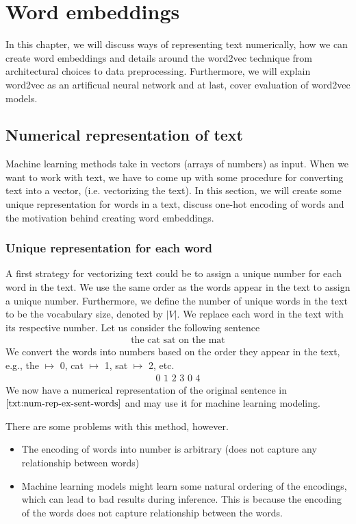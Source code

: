 \chapter{Word embeddings}
In this chapter, we will discuss ways of representing text numerically, how we can create word embeddings and details around the word2vec technique from architectural choices to data preprocessing. Furthermore, we will explain word2vec as an artificual neural network and at last, cover evaluation of word2vec models.

\section{Numerical representation of text}
Machine learning methods take in vectors (arrays of numbers) as input. When we want to work with text, we have to come up with some procedure for converting text into a vector, (i.e. vectorizing the text).
In this section, we will create some unique representation for words in a text, discuss one-hot encoding of words and the motivation behind creating word embeddings.

\subsection{Unique representation for each word}
\label{unique-representation-for-each-word}
A first strategy for vectorizing text could be to assign a unique number for each word in the text. We use the same order as the words appear in the text to assign a unique number. Furthermore, we define the number of unique words in the text to be the vocabulary size, denoted by $|V|$. We replace each word in the text with its respective number. Let us consider the following sentence
\begin{align}
    \text{the cat sat on the mat} \label{txt:num-rep-ex-sent-words}
\end{align}
\noindent
We convert the words into numbers based on the order they appear in the text, e.g., the $\mapsto$ 0, cat $\mapsto$ 1, sat $\mapsto$ 2, etc.
\begin{align}
    \text{0 1 2 3 0 4} \label{txt:num-rep-ex-sent}
\end{align}
We now have a numerical representation of the original sentence in $\ref{txt:num-rep-ex-sent-words}$ and may use it for machine learning modeling.

\noindent
There are some problems with this method, however.
\begin{itemize}
    \item The encoding of words into number is arbitrary (does not capture any relationship between words)
    \item Machine learning models might learn some natural ordering of the encodings, which can lead to bad results during inference. This is because the encoding of the words does not capture relationship between the words.
\end{itemize}

